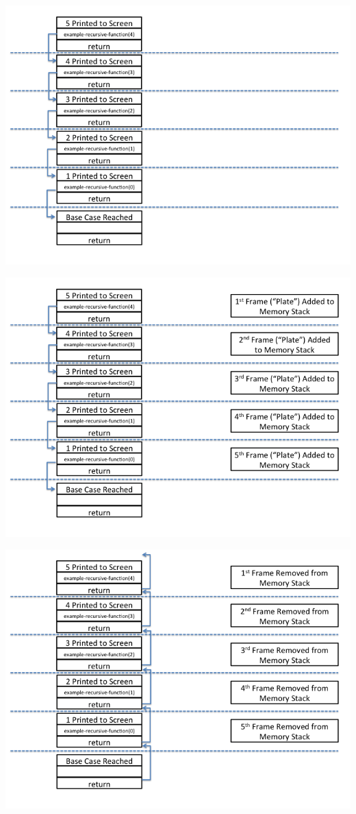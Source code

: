 \documentclass{beamer}
\begin{document}
\begin{frame}
\includegraphics[scale=0.5]{Slide2.png}
\end{frame}

\begin{frame}
\includegraphics[scale=0.5]{Slide3.png}
\end{frame}

\begin{frame}
\includegraphics[scale=0.5]{Slide4.png}
\end{frame}
\end{document}
